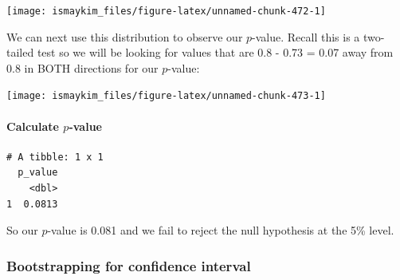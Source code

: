 \documentclass[12pt,]{krantz}
\makeatletter
\newenvironment{Shaded}{\begin{snugshade}}{\end{snugshade}}
\newcommand{\KeywordTok}[1]{\textcolor[rgb]{0.27,0.27,0.27}{\textbf{#1}}}
\newcommand{\DataTypeTok}[1]{\textcolor[rgb]{0.27,0.27,0.27}{#1}}
\newcommand{\StringTok}[1]{\textcolor[rgb]{0.5,0.5,0.5}{#1}}
\newcommand{\OperatorTok}[1]{\textcolor[rgb]{0.43,0.43,0.43}{\textbf{#1}}}
\newcommand{\NormalTok}[1]{#1}
\let\oldparagraph\paragraph
\renewcommand{\paragraph}[1]{\oldparagraph{#1}\mbox{}}
\newenvironment{kframe}{%
\medskip{}
\setlength{\fboxsep}{.8em}
 \def\at@end@of@kframe{}%
 \ifinner\ifhmode%
  \def\at@end@of@kframe{\end{minipage}}%
  \begin{minipage}{\columnwidth}%
 \fi\fi%
 \def\FrameCommand##1{\hskip\@totalleftmargin \hskip-\fboxsep
 \colorbox{shadecolor}{##1}\hskip-\fboxsep
     \hskip-\linewidth \hskip-\@totalleftmargin \hskip\columnwidth}%
 \MakeFramed {\advance\hsize-\width
   \@totalleftmargin\z@ \linewidth\hsize
   \@setminipage}}%
 {\par\unskip\endMakeFramed%
 \at@end@of@kframe}
\renewenvironment{Shaded}{\begin{kframe}}{\end{kframe}}
\theoremstyle{definition}
\theoremstyle{definition}
\theoremstyle{definition}
\theoremstyle{remark}
\makeatother
\begin{document}
\begin{center}\texttt{[image: ismaykim\_files/figure-latex/unnamed-chunk-472-1]} \end{center}

We can next use this distribution to observe our \(p\)-value. Recall
this is a two-tailed test so we will be looking for values that are 0.8
- 0.73 = 0.07 away from 0.8 in BOTH directions for our \(p\)-value:

\begin{Shaded}
\end{Shaded}

\begin{center}\texttt{[image: ismaykim\_files/figure-latex/unnamed-chunk-473-1]} \end{center}

\paragraph{\texorpdfstring{Calculate
\(p\)-value}{Calculate p-value}}\label{calculate-p-value-1}

\begin{Shaded}
\end{Shaded}

\begin{verbatim}
# A tibble: 1 x 1
  p_value
    <dbl>
1  0.0813
\end{verbatim}

So our \(p\)-value is 0.081 and we fail to reject the null hypothesis at
the 5\% level.

\subsubsection*{Bootstrapping for confidence
interval}\label{bootstrapping-for-confidence-interval-1}
\end{document}
